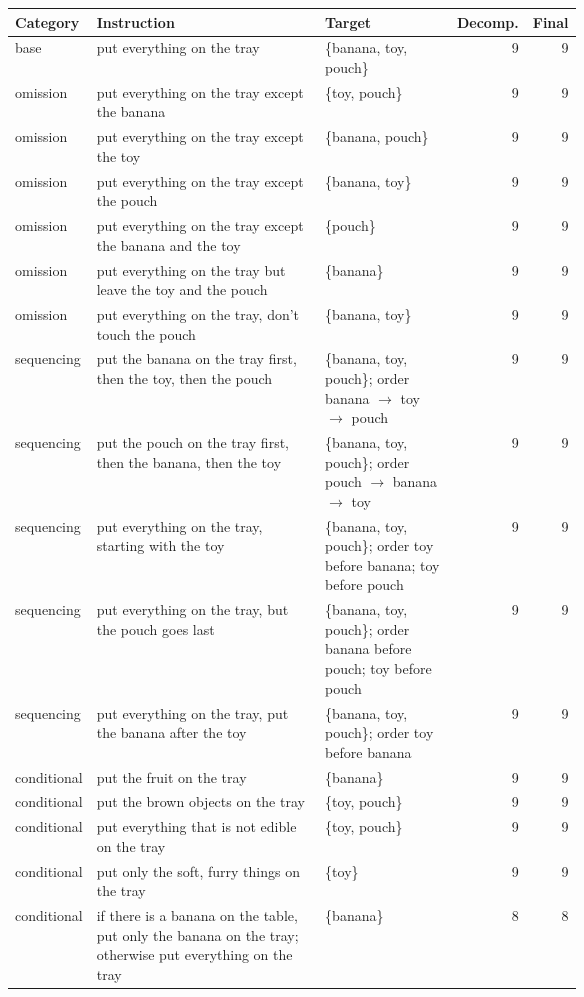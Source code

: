 {\small
\begin{longtable}{l p{0.42\linewidth} p{0.24\linewidth} r r}
\toprule
Category & Instruction & Target & Decomp. & Final \\
\midrule
\endhead
base & put everything on the tray & \{banana, toy, pouch\} & 9 & 9 \\
omission & put everything on the tray except the banana & \{toy, pouch\} & 9 & 9 \\
omission & put everything on the tray except the toy & \{banana, pouch\} & 9 & 9 \\
omission & put everything on the tray except the pouch & \{banana, toy\} & 9 & 9 \\
omission & put everything on the tray except the banana and the toy & \{pouch\} & 9 & 9 \\
omission & put everything on the tray but leave the toy and the pouch & \{banana\} & 9 & 9 \\
omission & put everything on the tray, don't touch the pouch & \{banana, toy\} & 9 & 9 \\
sequencing & put the banana on the tray first, then the toy, then the pouch & \{banana, toy, pouch\}; order banana $\rightarrow$ toy $\rightarrow$ pouch & 9 & 9 \\
sequencing & put the pouch on the tray first, then the banana, then the toy & \{banana, toy, pouch\}; order pouch $\rightarrow$ banana $\rightarrow$ toy & 9 & 9 \\
sequencing & put everything on the tray, starting with the toy & \{banana, toy, pouch\}; order toy before banana; toy before pouch & 9 & 9 \\
sequencing & put everything on the tray, but the pouch goes last & \{banana, toy, pouch\}; order banana before pouch; toy before pouch & 9 & 9 \\
sequencing & put everything on the tray, put the banana after the toy & \{banana, toy, pouch\}; order toy before banana & 9 & 9 \\
conditional & put the fruit on the tray & \{banana\} & 9 & 9 \\
conditional & put the brown objects on the tray & \{toy, pouch\} & 9 & 9 \\
conditional & put everything that is not edible on the tray & \{toy, pouch\} & 9 & 9 \\
conditional & put only the soft, furry things on the tray & \{toy\} & 9 & 9 \\
conditional & if there is a banana on the table, put only the banana on the tray; otherwise put everything on the tray & \{banana\} & 8 & 8 \\

\end{longtable}}
